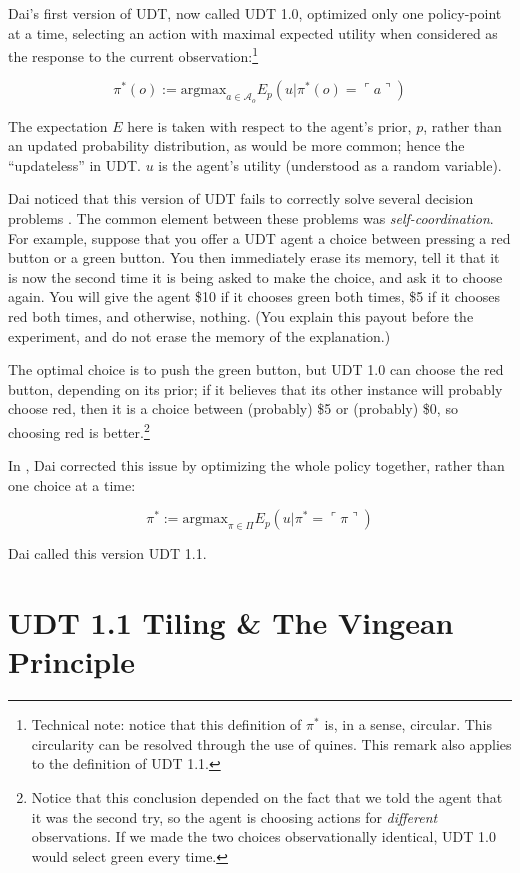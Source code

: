\documentclass{article}
\newcommand{\qq}[1]{\ulcorner #1 \urcorner}
\begin{document}
Dai's first version of UDT, now called UDT 1.0, optimized only one policy-point at a time, selecting an action with maximal expected utility when considered as the response to the current observation:\footnote{Technical note: notice that this definition of $\pi^*$ is, in a sense, circular. This circularity can be resolved through the use of quines. This remark also applies to the definition of UDT 1.1.}

$$\pi^*(o) := \text{argmax}_{a \in \mathcal{A}_o} E_{p}(u|\pi^*(o)=\qq{a})$$

The expectation $E$ here is taken with respect to the agent's prior, $p$, rather than an updated probability distribution, as would be more common; hence the ``updateless'' in UDT. $u$ is the agent's utility (understood as a random variable).

Dai noticed that this version of UDT fails to correctly solve several decision problems \cite{dai2010udt}. The common element between these problems was \emph{self-coordination}. For example, suppose that you offer a UDT agent a choice between pressing a red button or a green button. You then immediately erase its memory, tell it that it is now the second time it is being asked to make the choice, and ask it to choose again. You will give the agent \$10 if it chooses green both times, \$5 if it chooses red both times, and otherwise, nothing. (You explain this payout before the experiment, and do not erase the memory of the explanation.)

The optimal choice is to push the green button, but UDT 1.0 can choose the red button, depending on its prior; if it believes that its other instance will probably choose red, then it is a choice between (probably) \$5 or (probably) \$0, so choosing red is better.\footnote{Notice that this conclusion depended on the fact that we told the agent that it was the second try, so the agent is choosing actions for \emph{different} observations. If we made the two choices observationally identical, UDT 1.0 would select green every time.} 

In \cite{dai2010udt}, Dai corrected this issue by optimizing the whole policy together, rather than one choice at a time: 

$$\pi^* := \text{argmax}_{\pi \in \Pi} E_{p}(u|\pi^*=\qq{\pi})$$

Dai called this version UDT 1.1.

\section{UDT 1.1 Tiling \& The Vingean Principle}
\end{document}
